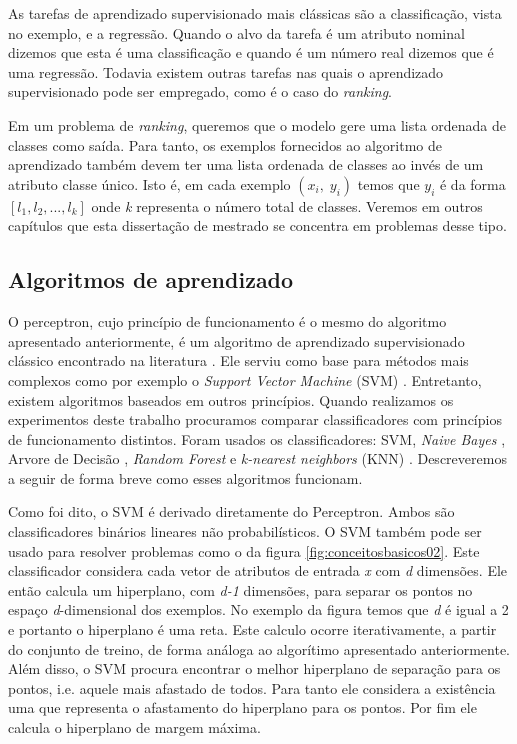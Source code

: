 As tarefas de aprendizado supervisionado mais clássicas são a classificação, vista no exemplo, e a regressão.
Quando o alvo da tarefa é um atributo nominal dizemos que esta é uma classificação e quando é um número real dizemos que é uma regressão.
Todavia existem outras tarefas nas quais o aprendizado supervisionado pode ser empregado, como é o caso do \textit{ranking}.

Em um problema de \textit{ranking}, queremos que o modelo gere uma lista ordenada de classes como saída.
Para tanto, os exemplos fornecidos ao algoritmo de aprendizado também devem ter uma lista ordenada de classes ao invés de um atributo classe único.
Isto é, em cada exemplo $ (x_i,\; y_i) $ temos que $y_i$ é da forma $ [l_1, l_2, ..., l_k] $ onde \textit{k} representa o número total de classes. Veremos em outros capítulos que esta dissertação de mestrado se concentra em problemas desse tipo.

\subsection{Algoritmos de aprendizado}

O perceptron, cujo princípio de funcionamento é o mesmo do algoritmo apresentado anteriormente, é um algoritmo de aprendizado supervisionado clássico encontrado na literatura \cite{Rosenblatt}.
Ele serviu como base para métodos mais complexos como por exemplo o \textit{Support Vector Machine} (SVM) \cite{Chang}.
Entretanto, existem algoritmos baseados em outros princípios.
Quando realizamos os experimentos deste trabalho procuramos comparar classificadores com princípios de funcionamento distintos.
Foram usados os classificadores: SVM, \textit{Naive Bayes} \cite{Murphy}, Arvore de Decisão \cite{Quinlan}, \textit{Random Forest} \cite{Breiman} e \textit{k-nearest neighbors} (KNN) \cite{Duda}.
Descreveremos a seguir de forma breve como esses algoritmos funcionam.

Como foi dito, o SVM é derivado diretamente do Perceptron.
Ambos são classificadores binários lineares não probabilísticos.
O SVM também pode ser usado para resolver problemas como o da figura \ref{fig:conceitosbasicos02}.
Este classificador considera cada vetor de atributos de entrada \textit{x} com \textit{d} dimensões.
Ele então calcula um hiperplano, com \textit{d-1} dimensões, para separar os pontos no espaço \textit{d}-dimensional dos exemplos.
No exemplo da figura temos que \textit{d} é igual a 2 e portanto o hiperplano é uma reta.
Este calculo ocorre iterativamente, a partir do conjunto de treino, de forma análoga ao algorítimo apresentado anteriormente.
Além disso, o SVM procura encontrar o melhor hiperplano de separação para os pontos, i.e. aquele mais afastado de todos. 
Para tanto ele considera a existência uma  que representa o afastamento do hiperplano para os pontos.
Por fim ele calcula o hiperplano de margem máxima.

